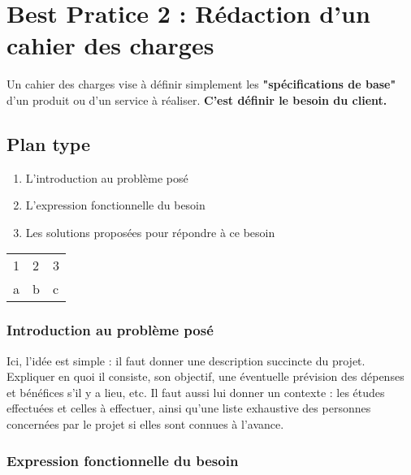 \section{Best Pratice 2 : Rédaction d'un cahier des charges}

Un cahier des charges vise à définir simplement les \textbf{"spécifications de base"} d’un produit ou d’un service à réaliser.
\textbf{C'est définir le besoin du client.}
\subsection{Plan type}
    \begin{enumerate}
      \item  L'introduction au problème posé
      \item L'expression fonctionnelle du besoin
      \item Les solutions proposées pour répondre à ce besoin
    \end{enumerate}
  
\begin{tabular}{l >{\columncolor{gray}} l l}
   1 & 2 & 3 \\
   a & b & c
\end{tabular}
   
\subsubsection{Introduction au problème posé}


Ici, l'idée est simple : il faut donner une description succincte du projet. Expliquer en quoi il consiste, son objectif, une éventuelle prévision des dépenses et bénéfices s'il y a lieu, etc.
Il faut aussi lui donner un contexte : les études effectuées et celles à effectuer, ainsi qu'une liste exhaustive des personnes concernées par le projet si elles sont connues à l'avance.

\subsubsection{Expression fonctionnelle du besoin}

